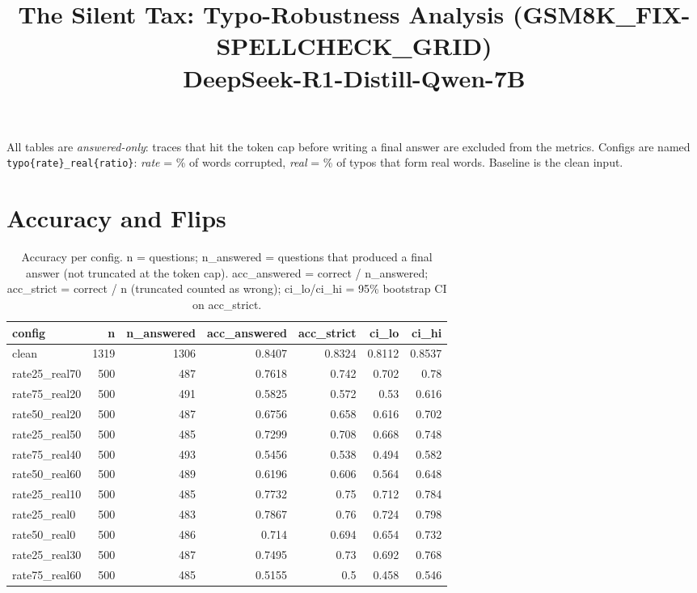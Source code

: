 \documentclass[11pt]{article}
\title{The Silent Tax: Typo-Robustness Analysis (GSM8K\_FIX-SPELLCHECK\_GRID)\\\large DeepSeek-R1-Distill-Qwen-7B}
\date{}
\begin{document}
\maketitle
\noindent All tables are \emph{answered-only}: traces that hit the token cap before writing a final answer are excluded from the metrics. Configs are named \texttt{typo\{rate\}\_real\{ratio\}}: \emph{rate} = \% of words corrupted, \emph{real} = \% of typos that form real words. Baseline is the clean input.

\section*{Accuracy and Flips}
\begin{table}[H]
\centering
\caption{Accuracy per config. n = questions; n\_answered = questions that produced a final answer (not truncated at the token cap). acc\_answered = correct / n\_answered; acc\_strict = correct / n (truncated counted as wrong); ci\_lo/ci\_hi = 95\% bootstrap CI on acc\_strict.}
\small
\begin{adjustbox}{max width=\textwidth}
\begin{tabular}{lrrrrrr}
\toprule
\textbf{config} & \textbf{n} & \textbf{n\_answered} & \textbf{acc\_answered} & \textbf{acc\_strict} & \textbf{ci\_lo} & \textbf{ci\_hi} \\
\midrule
clean & 1319 & 1306 & 0.8407 & 0.8324 & 0.8112 & 0.8537 \\
rate25\_real70 & 500 & 487 & 0.7618 & 0.742 & 0.702 & 0.78 \\
rate75\_real20 & 500 & 491 & 0.5825 & 0.572 & 0.53 & 0.616 \\
rate50\_real20 & 500 & 487 & 0.6756 & 0.658 & 0.616 & 0.702 \\
rate25\_real50 & 500 & 485 & 0.7299 & 0.708 & 0.668 & 0.748 \\
rate75\_real40 & 500 & 493 & 0.5456 & 0.538 & 0.494 & 0.582 \\
rate50\_real60 & 500 & 489 & 0.6196 & 0.606 & 0.564 & 0.648 \\
rate25\_real10 & 500 & 485 & 0.7732 & 0.75 & 0.712 & 0.784 \\
rate25\_real0 & 500 & 483 & 0.7867 & 0.76 & 0.724 & 0.798 \\
rate50\_real0 & 500 & 486 & 0.714 & 0.694 & 0.654 & 0.732 \\
rate25\_real30 & 500 & 487 & 0.7495 & 0.73 & 0.692 & 0.768 \\
rate75\_real60 & 500 & 485 & 0.5155 & 0.5 & 0.458 & 0.546 \\

\end{tabular}
\end{adjustbox}
\end{table}
\end{document}
